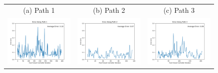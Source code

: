 \documentclass{article}
\begin{document}
\begin{figure}[h]
\begin{center}
\begin{tabular}{c|c|c}
    (a) Path 1 & (b) Path 2 & (c) Path 3 \\
    \includegraphics[scale=.33]{path1_error.png} & 
    \includegraphics[scale=.33]{path2_error.png} & 
    \includegraphics[scale=.33]{path3_error.png} 

\end{tabular}
\end{center}
\end{figure}
\end{document}
